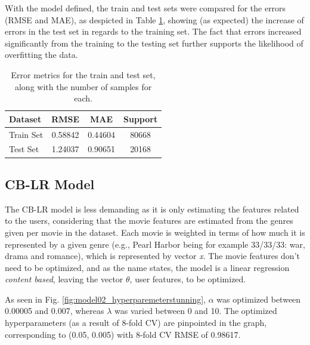 \documentclass[conference]{IEEEtran}
\begin{document}
With the model defined, the train and test sets were compared for the errors (RMSE and MAE), as despicted in Table \ref{tab:model01_results}, showing (as expected) the increase of errors in the test set in regards to the training set. The fact that errors increased significantly from the training to the testing set further supports the likelihood of overfitting the data.


\begin{table}[H]
\centering
\caption{Error metrics for the train and test set, along with the number of samples for each.}
\label{tab:model01_results}
\begin{tabular}{lccc}
\toprule
\textbf{Dataset} & \textbf{RMSE} & \textbf{MAE} & \textbf{Support} \\
\midrule
Train Set & 0.58842 & 0.44604 & 80668 \\
Test Set & 1.24037 & 0.90651 & 20168 \\
\bottomrule
\end{tabular}
\end{table}

\subsection{CB-LR Model}

The CB-LR model is less demanding as it is only estimating the features related to the users, considering that the movie features are estimated from the genres given per movie in the dataset. Each movie is weighted in terms of how much it is represented by a given genre (e.g., Pearl Harbor being for example 33/33/33: war, drama and romance), which is represented by vector \textit{x}. The movie features don't need to be optimized, and as the name states, the model is a linear regression \textit{content based}, leaving the vector \textit{$\theta$}, user features, to be optimized. 

As seen in Fig. \ref{fig:model02_hyperparemeterstunning}, $\alpha$ was optimized between 0.00005 and 0.007, whereas $\lambda$ was varied between 0 and 10. The optimized hyperparameters (as a result of 8-fold CV) are pinpointed in the graph, corresponding to (0.05, 0.005) with 8-fold CV RMSE of 0.98617.
\end{document}
